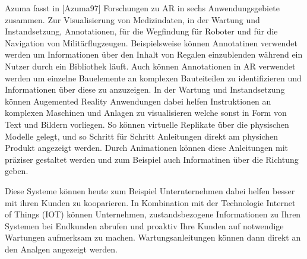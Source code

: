 Azuma fasst in [Azuma97]  Forschungen zu AR in sechs Anwendungsgebiete zusammen. Zur Visualisierung von Medizindaten, in der Wartung 
und Instandsetzung, Annotationen, für die Wegfindung für Roboter und für die Navigation von Militärflugzeugen. Beispielsweise können Annotatinen 
verwendet werden um Informationen über den Inhalt von Regalen einzublenden während ein Nutzer durch ein Bibliothek läuft. %
Auch können Annotationen in AR verwendet werden um einzelne Bauelemente an komplexen Bauteiteilen zu identifizieren und Informationen über diese zu anzuzeigen. 
In der Wartung und Instandsetzung können Augemented Reality Anwendungen dabei helfen Instruktionen an komplexen Maschinen und Anlagen zu visualisieren welche sonst in 
Form von Text und Bildern vorliegen. So können virtuelle Replikate über die physischen Modelle gelegt, und so Schritt für Schritt Anleitungen direkt am physichen Produkt angezeigt werden. 
Durch Animationen können diese Anleitungen mit präziser gestaltet werden und zum Beispiel auch Informatinen über die Richtung geben. 

Diese Systeme können heute zum Beispiel Unternternehmen dabei helfen besser mit ihren Kunden zu kooparieren. In Kombination mit der Technologie Internet of Things (IOT)  können Unternehmen,
zustandsbezogene Informationen zu Ihren Systemen bei Endkunden abrufen und proaktiv Ihre Kunden auf notwendige Wartungen aufmerksam zu machen. Wartungsanleitungen können dann direkt 
an den Analgen angezeigt werden.%

